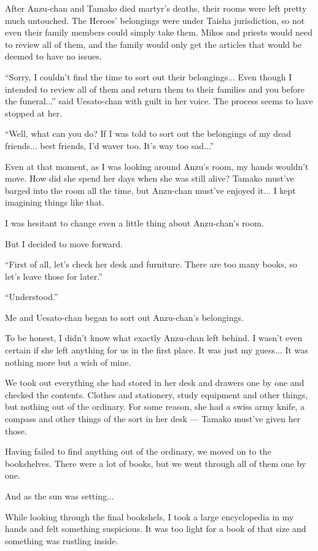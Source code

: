 After Anzu-chan and Tamako died martyr's deaths, their rooms were left pretty much untouched. The Heroes' belongings were under Taisha jurisdiction, so not even their family members could simply take them. Mikos and priests would need to review all of them, and the family would only get the articles that would be deemed to have no issues.

``Sorry, I couldn't find the time to sort out their belongings... Even though I intended to review all of them and return them to their families and you before the funeral...'' said Uesato-chan with guilt in her voice. The process seems to have stopped at her.

``Well, what can you do? If I was told to sort out the belongings of my dead friends... best friends, I'd waver too. It's way too sad...''

Even at that moment, as I was looking around Anzu's room, my hands wouldn't move. How did she spend her days when she was still alive? Tamako must've barged into the room all the time, but Anzu-chan must've enjoyed it... I kept imagining things like that.

I was hesitant to change even a little thing about Anzu-chan's room.

But I decided to move forward.

``First of all, let's check her desk and furniture. There are too many books, so let's leave those for later.''

``Understood.''

Me and Uesato-chan began to sort out Anzu-chan's belongings.

To be honest, I didn't know what exactly Anzu-chan left behind. I wasn't even certain if she left anything for us in the first place. It was just my guess... It was nothing more but a wish of mine.

We took out everything she had stored in her desk and drawers one by one and checked the contents. Clothes and stationery, study equipment and other things, but nothing out of the ordinary. For some reason, she had a swiss army knife, a compass and other things of the sort in her desk --- Tamako must've given her those.

Having failed to find anything out of the ordinary, we moved on to the bookshelves. There were a lot of books, but we went through all of them one by one.

And as the sun was setting...

While looking through the final bookshels, I took a large encyclopedia in my hands and felt something suspicious. It was too light for a book of that size and something was rustling inside.

